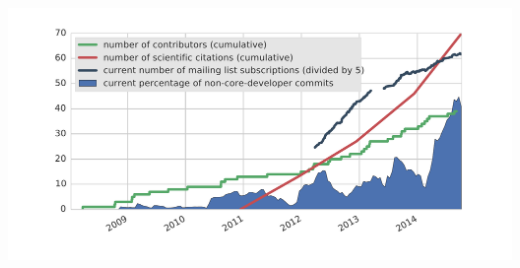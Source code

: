 \begin{multicols}{2}
\begin{center}
    \includegraphics[width=1.0\columnwidth]{./images/all_stats.pdf} \\
\end{center}
\end{multicols}

